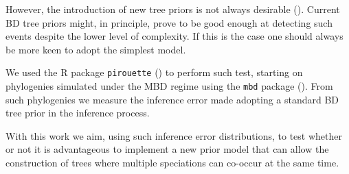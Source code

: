 However, the introduction of new tree priors is not always desirable (\citep{bilderbeek2019pirouette}). Current BD tree priors might, in principle, prove to be good enough at detecting such events despite the lower level of complexity. If this is the case one should always be more keen to adopt the simplest model.

We used the R package \verb;pirouette; (\citep{pirouette}) to perform such test, starting on phylogenies simulated under the MBD regime using the \verb;mbd; package (\citep{mbd}).
From such phylogenies we measure the inference error made adopting a standard BD tree prior in the inference process.

With this work we aim, using such inference error distributions, to test whether or not it is advantageous to implement a new prior model that can allow the construction of trees where multiple speciations can co-occur at the same time.
